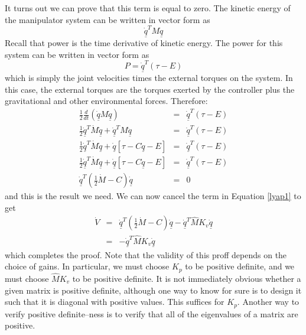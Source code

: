 \documentclass[]{article}
\begin{document}
It turns out we can prove that this term is equal to zero. The kinetic energy of the manipulator system can be written in vector form as
\begin{displaymath}
 \dot{\underline{q}}^{T}M\dot{\underline{q}}
\end{displaymath}
Recall that power is the time derivative of kinetic energy. The power for this system can be written in vector form as
\begin{displaymath}
 P = \dot{\underline{q}}^{T}\left(\tau-E\right)
\end{displaymath}
which is simply the joint velocities times the external torques on the system. In this case, the external torques are the torques exerted by the controller plus the gravitational and other environmental forces. Therefore:
\begin{eqnarray}
\frac{1}{2}\frac{d}{dt}\left(\dot{\underline{q}} M\dot{\underline{q}}\right) & = & \dot{\underline{q}}^{T}\left(\tau-E\right) \nonumber \\
\frac{1}{2}\dot{\underline{q}}^{T}\dot{M}\dot{\underline{q}} + \dot{\underline{q}}^{T}M\underline{\ddot{q}} & = & \dot{\underline{q}}^{T}\left(\tau-E\right) \nonumber \\
\frac{1}{2}\dot{\underline{q}}^{T}\dot{M}\dot{\underline{q}} + \dot{\underline{q}}\left[\tau - C\dot{\underline{q}} - E\right] & = & \dot{\underline{q}}^{T}\left(\tau-E\right) \nonumber \\
\frac{1}{2}\dot{\underline{q}}^{T}\dot{M}\dot{\underline{q}} + \dot{\underline{q}}\left[\tau - C\dot{\underline{q}} - E\right] & = & \dot{\underline{q}}^{T}\left(\tau-E\right) \nonumber \\
\dot{\underline{q}}^{T}\left(\frac{1}{2}\dot{M} - C\right)\dot{\underline{q}} & = & 0 \nonumber
\end{eqnarray}
and this is the result we need. We can now cancel the term in Equation \ref{lyap1}
to get
\begin{eqnarray}
\dot{V} & = & \dot{\underline{q}}^{T}\left( \frac{1}{2}\dot{M} - C\right)\dot{\underline{q}} - \dot{\underline{q}}^{T}\hat{M}K_{v}\dot{\underline{q}} \nonumber \\
& = & - \dot{\underline{q}}^{T}\hat{M}K_{v}\dot{\underline{q}} \nonumber
\end{eqnarray}
which completes the proof. Note that the validity of this proff depends on the choice of gains. In particular, we must choose $K_{p}$ to be positive definite, and we must choose $\hat{M}K_{v}$ to be positive definite. It is not immediately obvious whether a given matrix is positive definite, although one way to know for sure is to design it such that it is diagonal with positive values. This suffices for $K_{p}$. Another way to verify positive definite--ness is to verify that all of the eigenvalues of a matrix are positive.
\end{document}
